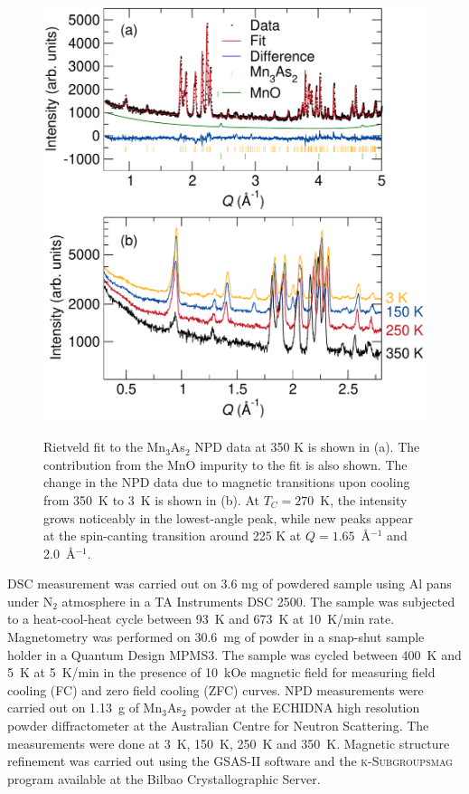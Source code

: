 \documentclass[10pt,doublespacing,edeposit]{uiucthesis2020}
\begin{document}
\begin{mainmatter}
\begin{figure}
\centering\includegraphics[width=0.75\columnwidth]{figures/ch6/350K_rietveld_diff_temp_NPD_cropped.pdf} \\
\caption{Rietveld fit to the Mn$_3$As$_2$ NPD data at 350 K is shown in (a). The contribution from the MnO impurity to the fit is also shown. The change in the NPD data due to magnetic transitions upon cooling from 350~K to 3~K is shown in (b). At $T_C = 270$~K, the intensity grows noticeably in the lowest-angle peak, while new peaks appear at the spin-canting transition around 225 K at $Q = 1.65$~\AA$^{-1}$ and 2.0~\AA$^{-1}$.
}
\label{fig:350K_data}
\end{figure}


DSC measurement was carried out on 3.6 mg of powdered sample using Al pans under N$_2$ atmosphere in a TA Instruments DSC 2500. The sample was subjected to a heat-cool-heat cycle between 93~K and 673~K at 10~K/min rate.
Magnetometry was performed on 30.6~mg of powder in a snap-shut sample holder in a Quantum Design MPMS3. The sample was cycled between 400~K and 5~K at 5~K/min in the presence of 10~kOe magnetic field for measuring field cooling (FC) and zero field cooling (ZFC) curves. NPD measurements were carried out on 1.13~g of Mn$_3$As$_2$ powder at the \textsc{ECHIDNA} high resolution powder diffractometer \cite{Avdeev2018} at the Australian Centre for Neutron Scattering. The measurements were done at 3~K, 150~K, 250~K and 350~K. Magnetic structure refinement was carried out using the \textsc{GSAS-II} software \cite{Toby:aj5212} and the \textsc{k-Subgroupsmag} program \cite{Perez-Mato2015} available at the Bilbao Crystallographic Server.




\end{mainmatter}
\end{document}
